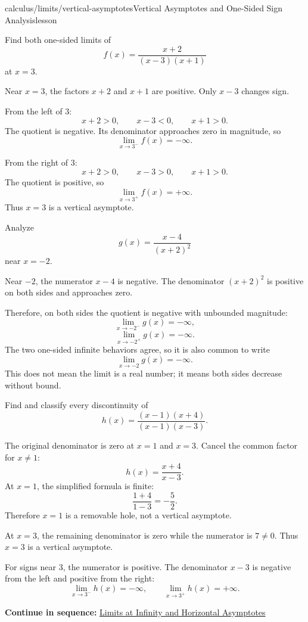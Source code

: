 \documentclass[11pt,openany]{book}
\theoremstyle{bgplain}
\newcounter{bgexample}[chapter]
\newcommand{\webnext}[2]{%
  \par\addvspace{1.2em}\noindent{\color{BGLine}\rule{\textwidth}{0.35pt}}\par\smallskip
  {\small\color{BGGray}\textbf{Continue in sequence:} \hyperlink{web:#1}{#2}}\par
}
\begin{document}
\begin{webpage}{calculus/limits/vertical-asymptotes}{Vertical Asymptotes and One-Sided Sign Analysis}{lesson}
\begin{bgexample}[title={A sign chart with several factors}]
Find both one-sided limits of
\[
  f(x)=\frac{x+2}{(x-3)(x+1)}
\]
at \(x=3\).

\begin{bgsolution}
Near \(x=3\), the factors \(x+2\) and \(x+1\) are positive. Only \(x-3\) changes sign.

From the left of \(3\):
\[
  x+2>0,\qquad x-3<0,\qquad x+1>0.
\]
The quotient is negative. Its denominator approaches zero in magnitude, so
\[
  \boxed{\lim_{x\to3^-}f(x)=-\infty}.
\]

From the right of \(3\):
\[
  x+2>0,\qquad x-3>0,\qquad x+1>0.
\]
The quotient is positive, so
\[
  \boxed{\lim_{x\to3^+}f(x)=+\infty}.
\]
Thus \(x=3\) is a vertical asymptote.
\end{bgsolution}
\end{bgexample}

\begin{bgexample}[title={Even multiplicity}]
Analyze
\[
  g(x)=\frac{x-4}{(x+2)^2}
\]
near \(x=-2\).

\begin{bgsolution}
Near \(-2\), the numerator \(x-4\) is negative. The denominator \((x+2)^2\) is positive on both sides and approaches zero.

Therefore, on both sides the quotient is negative with unbounded magnitude:
\[
  \boxed{\lim_{x\to-2^-}g(x)=-\infty},
\]
\[
  \boxed{\lim_{x\to-2^+}g(x)=-\infty}.
\]
The two one-sided infinite behaviors agree, so it is also common to write
\[
  \lim_{x\to-2}g(x)=-\infty.
\]
This does not mean the limit is a real number; it means both sides decrease without bound.
\end{bgsolution}
\end{bgexample}

\begin{bgexample}[title={Exam-level: hole versus asymptote}]
Find and classify every discontinuity of
\[
  h(x)=\frac{(x-1)(x+4)}{(x-1)(x-3)}.
\]

\begin{bgsolution}
The original denominator is zero at \(x=1\) and \(x=3\). Cancel the common factor for \(x\ne1\):
\[
  h(x)=\frac{x+4}{x-3}.
\]
At \(x=1\), the simplified formula is finite:
\[
  \frac{1+4}{1-3}=-\frac52.
\]
Therefore \(x=1\) is a removable hole, not a vertical asymptote.

At \(x=3\), the remaining denominator is zero while the numerator is \(7\ne0\). Thus \(x=3\) is a vertical asymptote.

For signs near \(3\), the numerator is positive. The denominator \(x-3\) is negative from the left and positive from the right:
\[
  \lim_{x\to3^-}h(x)=-\infty,
  \qquad
  \lim_{x\to3^+}h(x)=+\infty.
\]
\end{bgsolution}
\end{bgexample}
\webnext{calculus/limits/limits-at-infinity}{Limits at Infinity and Horizontal Asymptotes}
\end{webpage}
\end{document}
